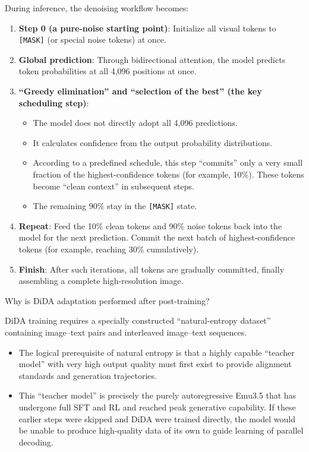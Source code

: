 During inference, the denoising workflow becomes:

\begin{enumerate}
\def\labelenumi{\arabic{enumi}.}
\tightlist
\item
  \textbf{Step 0 (a pure-noise starting point)}: Initialize all visual tokens to \texttt{{[}MASK{]}} (or special noise tokens) at once.
\item
  \textbf{Global prediction}: Through bidirectional attention, the model predicts token probabilities at all 4,096 positions at once.
\item
{}
  \textbf{``Greedy elimination'' and ``selection of the best'' (the key scheduling step)}:

  \begin{itemize}
  \tightlist
  \item
    The model does not directly adopt all 4,096 predictions.
  \item
    It calculates confidence from the output probability distributions.
  \item
    According to a predefined schedule, this step ``commits'' only a very small fraction of the highest-confidence tokens (for example, 10\%). These tokens become ``clean context'' in subsequent steps.
  \item
    The remaining 90\% stay in the \texttt{{[}MASK{]}} state.
  \end{itemize}
\item
  \textbf{Repeat}: Feed the 10\% clean tokens and 90\% noise tokens back into the model for the next prediction. Commit the next batch of highest-confidence tokens (for example, reaching 30\% cumulatively).
\item
  \textbf{Finish}: After such iterations, all tokens are gradually committed, finally assembling a complete high-resolution image.
\end{enumerate}

Why is DiDA adaptation performed after post-training?

DiDA training requires a specially constructed ``natural-entropy dataset'' containing image--text pairs and interleaved image--text sequences.

\begin{itemize}
\tightlist
\item
  The logical prerequisite of natural entropy is that a highly capable ``teacher model'' with very high output quality must first exist to provide alignment standards and generation trajectories.
\item
  This ``teacher model'' is precisely the purely autoregressive Emu3.5 that has undergone full SFT and RL and reached peak generative capability. If these earlier steps were skipped and DiDA were trained directly, the model would be unable to produce high-quality data of its own to guide learning of parallel decoding.
\end{itemize}

